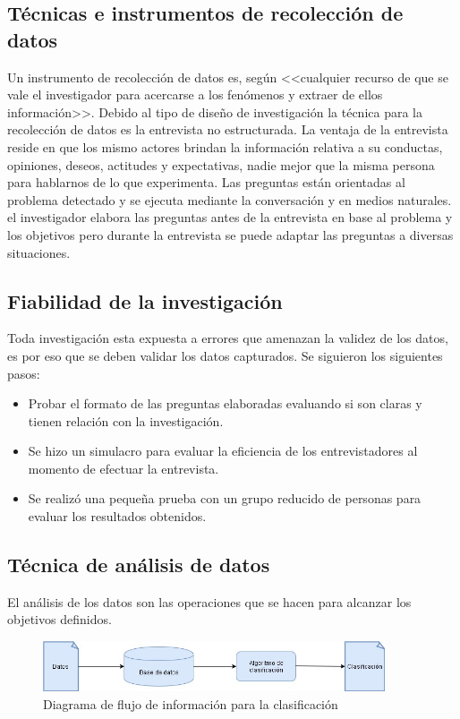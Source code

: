 \documentclass[11pt,openany]{book}
\newcounter{ns}
\begin{document}
	\subsection{Técnicas e instrumentos de recolección de datos}
	Un instrumento de recolección de datos es, según \cite{sabino} <<cualquier recurso de que se vale el investigador para acercarse a los fenómenos y extraer de ellos información>>. Debido al tipo de diseño de investigación la técnica para la recolección de datos es la entrevista no estructurada. La ventaja de la entrevista reside en que los mismo actores brindan la información relativa a su conductas, opiniones, deseos, actitudes y expectativas, nadie mejor que la misma persona para hablarnos de lo que experimenta. Las  preguntas están orientadas al problema detectado y se ejecuta mediante la conversación y en medios naturales. el investigador elabora las preguntas antes de la entrevista en base al problema y los objetivos pero durante la entrevista se puede adaptar las preguntas a diversas situaciones.

	\subsection{Fiabilidad de la investigación}
	Toda investigación esta expuesta a errores que amenazan la validez de los datos, es por eso que se deben validar los datos capturados. Se siguieron los siguientes pasos:
	\begin{itemize}
		\item Probar el formato de las preguntas elaboradas evaluando si son claras y tienen relación con la investigación.
		\item Se hizo un simulacro para evaluar la eficiencia de los entrevistadores al momento de efectuar la entrevista.
		\item Se realizó una pequeña prueba con un grupo reducido de personas para evaluar los resultados obtenidos.
	\end{itemize}

	\subsection{Técnica de análisis de datos}
	El análisis de los datos son las operaciones que se hacen para alcanzar los objetivos definidos. \\

	\begin{figure}[htb]
			\centering
			\includegraphics[width=0.9\textwidth]{imagenes/clasificacion.jpg}
			\caption{Diagrama de flujo de información para la clasificación}
			\label{Flujo_de_informacion}
	\end{figure}
\end{document}
